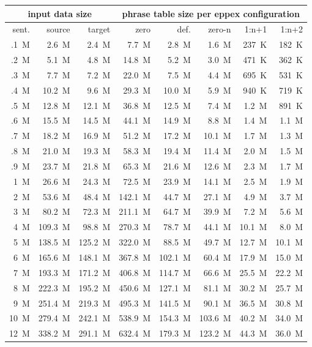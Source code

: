 \begin{table}[ht]
\centering
\begin{tabular}{ | r | r | r | r | r | r | r | r | }
\hline
\multicolumn{3}{|c|}{input data size} & \multicolumn{5}{|c|}{phrase table size per eppex configuration} \\
\hline
sent. & source & target & zero & def. & zero-n & 1:n+1 & 1:n+2 \\
\hline
\hline
.1~M & 2.6~M & 2.4~M & 7.7~M & 2.8~M & 1.6~M & 237~K & 182~K \\
.2~M & 5.1~M & 4.8~M & 14.8~M & 5.2~M & 3.0~M & 471~K & 362~K \\
.3~M & 7.7~M & 7.2~M & 22.0~M & 7.5~M & 4.4~M & 695~K & 531~K \\
.4~M & 10.2~M & 9.6~M & 29.3~M & 10.0~M & 5.9~M & 940~K & 719~K \\
.5~M & 12.8~M & 12.1~M & 36.8~M & 12.5~M & 7.4~M & 1.2~M & 891~K \\
.6~M & 15.5~M & 14.5~M & 44.1~M & 14.9~M & 8.8~M & 1.4~M & 1.1~M \\
.7~M & 18.2~M & 16.9~M & 51.2~M & 17.2~M & 10.1~M & 1.7~M & 1.3~M \\
.8~M & 21.0~M & 19.3~M & 58.3~M & 19.4~M & 11.4~M & 2.0~M & 1.5~M \\
.9~M & 23.7~M & 21.8~M & 65.3~M & 21.6~M & 12.6~M & 2.3~M & 1.7~M \\
1~M & 26.6~M & 24.3~M & 72.5~M & 23.9~M & 14.1~M & 2.5~M & 1.9~M \\
\hline
2~M & 53.6~M & 48.4~M & 142.1~M & 44.7~M & 27.1~M & 4.9~M & 3.7~M \\
3~M & 80.2~M & 72.3~M & 211.1~M & 64.7~M & 39.9~M & 7.2~M & 5.6~M \\
4~M & 109.3~M & 98.8~M & 270.3~M & 78.7~M & 44.1~M & 10.1~M & 8.0~M \\
5~M & 138.5~M & 125.2~M & 322.0~M & 88.5~M & 49.7~M & 12.7~M & 10.1~M \\
6~M & 165.6~M & 148.1~M & 367.8~M & 102.1~M & 60.4~M & 17.9~M & 15.0~M \\
7~M & 193.3~M & 171.2~M & 406.8~M & 114.7~M & 66.6~M & 25.5~M & 22.2~M \\
8~M & 222.3~M & 195.2~M & 450.6~M & 127.1~M & 81.1~M & 30.2~M & 25.7~M \\
9~M & 251.4~M & 219.3~M & 495.3~M & 141.5~M & 90.1~M & 36.5~M & 30.8~M \\
10~M & 279.4~M & 242.1~M & 538.9~M & 154.3~M & 103.6~M & 40.2~M & 34.0~M \\
\hline
12~M & 338.2~M & 291.1~M & 632.4~M & 179.3~M & 123.2~M & 44.3~M & 36.0~M \\

\end{tabular}
\end{table}
